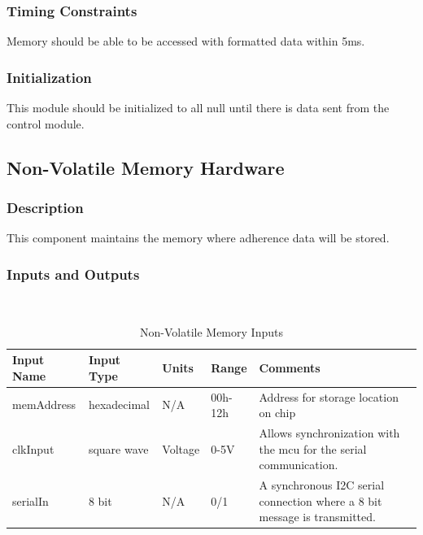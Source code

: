 \documentclass[12pt,titlepage]{article}
\begin{document}
\subsubsection*{Timing Constraints}
Memory should be able to be accessed with formatted data within 5ms.
\subsubsection*{Initialization}
This module should be initialized to all null until there is data sent from the control module.
\subsection{Non-Volatile Memory Hardware }
\subsubsection*{Description}
This component maintains the memory where adherence data will be stored.
\subsubsection*{Inputs and Outputs}
$ $\\
\begin{table}[ht!]
\begin{center}
\begin{adjustbox}{max width=\textwidth}
\small
\begin{tabular}{|p{}|p{}|p{}|p{}|p{}|}
 \hline
 \textbf{Input Name} & \textbf{Input Type} & \textbf{Units} &\textbf{Range} & \textbf{Comments} \\
 \hline 
 memAddress & hexadecimal  & N/A & 00h-12h & Address for storage location on chip \\
 \hline
  clkInput & square wave  & Voltage & 0-5V & Allows synchronization with the mcu for the serial communication. \\
 \hline
 serialIn & 8 bit  & N/A & 0/1 & A synchronous I2C serial connection where a 8 bit message is transmitted. \\
 \hline
\end{tabular}
\end{adjustbox}
\end{center}
\caption{Non-Volatile Memory  Inputs}
\end{table}
\end{document}
